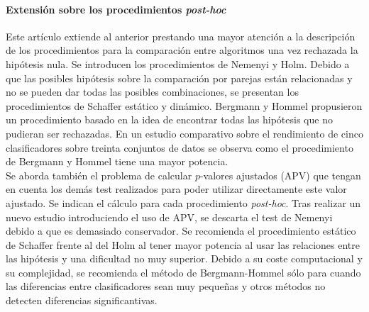\paragraph{Extensión sobre los procedimientos 
\textit{post-hoc}} \cite{GARCIAHERRERA08} Este artículo 
extiende al anterior prestando una mayor atención a la 
descripción de los procedimientos para la comparación entre 
algoritmos una vez rechazada la hipótesis nula. Se introducen
los procedimientos de Nemenyi y Holm. Debido a que las 
posibles hipótesis sobre la comparación  por parejas están 
relacionadas y no se pueden dar todas las posibles 
combinaciones, se presentan los procedimientos de 
Schaffer estático y dinámico. Bergmann y Hommel propusieron 
un procedimiento basado en la idea de encontrar todas las 
hipótesis que no pudieran ser rechazadas. En un estudio 
comparativo sobre el rendimiento de cinco clasificadores 
sobre treinta conjuntos de datos se observa como el 
procedimiento de Bergmann y Hommel tiene una mayor 
potencia.\\

	Se aborda también el problema de calcular $p$-valores 
ajustados (APV) que tengan en cuenta los demás test 
realizados para poder utilizar directamente este valor 
ajustado. Se indican el cálculo para cada procedimiento 
\textit{post-hoc}. Tras realizar un nuevo estudio 
introduciendo el uso de APV, se descarta el test de Nemenyi 
debido a que es demasiado conservador. Se recomienda el 
procedimiento estático de Schaffer frente al del Holm al 
tener mayor potencia al usar las relaciones entre las 
hipótesis y una dificultad no muy superior. Debido a su coste 
computacional y su complejidad, se recomienda el método de 
Bergmann-Hommel sólo para cuando las diferencias entre 
clasificadores sean muy pequeñas y otros métodos no detecten 
diferencias significantivas.

